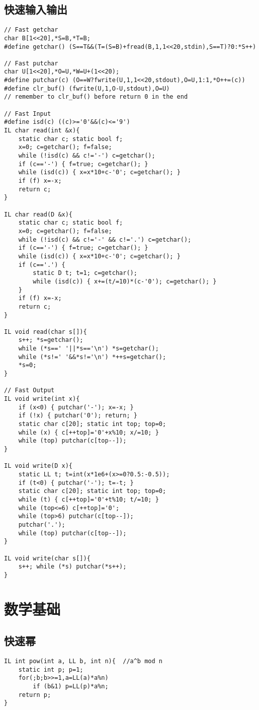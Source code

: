 \documentclass{article}
\begin{document}
\subsection{快速输入输出}
\begin{lstlisting}
// Fast getchar
char B[1<<20],*S=B,*T=B;
#define getchar() (S==T&&(T=(S=B)+fread(B,1,1<<20,stdin),S==T)?0:*S++)

// Fast putchar
char U[1<<20],*O=U,*W=U+(1<<20);
#define putchar(c) (O==W?fwrite(U,1,1<<20,stdout),O=U,1:1,*O++=(c))
#define clr_buf() (fwrite(U,1,O-U,stdout),O=U)
// remember to clr_buf() before return 0 in the end

// Fast Input
#define isd(c) ((c)>='0'&&(c)<='9')
IL char read(int &x){
	static char c; static bool f;
	x=0; c=getchar(); f=false;
	while (!isd(c) && c!='-') c=getchar();
	if (c=='-') { f=true; c=getchar(); }
	while (isd(c)) { x=x*10+c-'0'; c=getchar(); }
	if (f) x=-x;
	return c;
}

IL char read(D &x){
	static char c; static bool f;
	x=0; c=getchar(); f=false;
	while (!isd(c) && c!='-' && c!='.') c=getchar();
	if (c=='-') { f=true; c=getchar(); }
	while (isd(c)) { x=x*10+c-'0'; c=getchar(); }
	if (c=='.') {
		static D t; t=1; c=getchar();
		while (isd(c)) { x+=(t/=10)*(c-'0'); c=getchar(); }
	}
	if (f) x=-x;
	return c;
}

IL void read(char s[]){
	s++; *s=getchar();
	while (*s==' '||*s=='\n') *s=getchar();
	while (*s!=' '&&*s!='\n') *++s=getchar();
	*s=0;
}

// Fast Output
IL void write(int x){
	if (x<0) { putchar('-'); x=-x; }
	if (!x) { putchar('0'); return; }
	static char c[20]; static int top; top=0;
	while (x) { c[++top]='0'+x%10; x/=10; }
	while (top) putchar(c[top--]);
}

IL void write(D x){
	static LL t; t=int(x*1e6+(x>=0?0.5:-0.5));
	if (t<0) { putchar('-'); t=-t; }
	static char c[20]; static int top; top=0;
	while (t) { c[++top]='0'+t%10; t/=10; }
	while (top<=6) c[++top]='0';
	while (top>6) putchar(c[top--]);
	putchar('.');
	while (top) putchar(c[top--]);
}

IL void write(char s[]){
	s++; while (*s) putchar(*s++);
}
\end{lstlisting}


\section{数学基础}

\subsection{快速幂}
\begin{lstlisting}
IL int pow(int a, LL b, int n){  //a^b mod n
	static int p; p=1;
	for(;b;b>>=1,a=LL(a)*a%n)
		if (b&1) p=LL(p)*a%n;
    return p;
}
\end{lstlisting}
\end{document}
